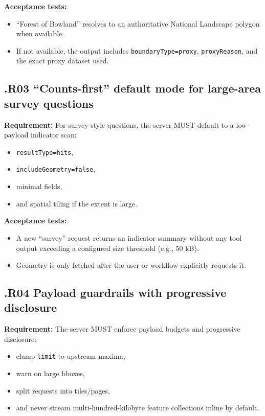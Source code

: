 \textbf{Acceptance tests:}
\begin{itemize}[leftmargin=*]
\item “Forest of Bowland” resolves to an authoritative National Landscape polygon when available.
\item If not available, the output includes \texttt{boundaryType=proxy}, \texttt{proxyReason}, and the exact proxy dataset used.
\end{itemize}

\subsection*{\thesection.R03 “Counts-first” default mode for large-area survey questions}
\textbf{Requirement:} For survey-style questions, the server MUST default to a low-payload indicator scan: \cite{owasp_llm_top10,ncsc_secure_ai_guidelines}
\begin{itemize}[leftmargin=*]
\item \texttt{resultType=hits},
\item \texttt{includeGeometry=false},
\item minimal fields,
\item and spatial tiling if the extent is large.
\end{itemize}

\textbf{Acceptance tests:}
\begin{itemize}[leftmargin=*]
\item A new “survey” request returns an indicator summary without any tool output exceeding a configured size threshold (e.g., 50 kB).
\item Geometry is only fetched after the user or workflow explicitly requests it.
\end{itemize}

\subsection*{\thesection.R04 Payload guardrails with progressive disclosure}
\textbf{Requirement:} The server MUST enforce payload budgets and progressive disclosure: \cite{owasp_llm_top10,ncsc_secure_ai_guidelines}
\begin{itemize}[leftmargin=*]
\item clamp \texttt{limit} to upstream maxima,
\item warn on large bboxes,
\item split requests into tiles/pages,
\item and never stream multi-hundred-kilobyte feature collections inline by default.
\end{itemize}

